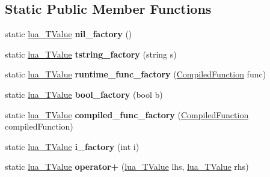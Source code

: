 \subsection*{Static Public Member Functions}
\begin{DoxyCompactItemize}
\item 
\mbox{\label{classzlua_1_1lua___t_value_a9b0783880dcd50991ac1f6abb71f5c25}} 
static \mbox{\hyperlink{classzlua_1_1lua___t_value}{lua\+\_\+\+T\+Value}} {\bfseries nil\+\_\+factory} ()
\item 
\mbox{\label{classzlua_1_1lua___t_value_a8bd4399873075abd5d6610da5966a171}} 
static \mbox{\hyperlink{classzlua_1_1lua___t_value}{lua\+\_\+\+T\+Value}} {\bfseries tstring\+\_\+factory} (string s)
\item 
\mbox{\label{classzlua_1_1lua___t_value_a8a92c76819e7f16495848cbc6daf6c25}} 
static \mbox{\hyperlink{classzlua_1_1lua___t_value}{lua\+\_\+\+T\+Value}} {\bfseries runtime\+\_\+func\+\_\+factory} (\mbox{\hyperlink{classzlua_1_1_compiled_function}{Compiled\+Function}} func)
\item 
\mbox{\label{classzlua_1_1lua___t_value_a21f1aa815c2d630491ea1972eb89b789}} 
static \mbox{\hyperlink{classzlua_1_1lua___t_value}{lua\+\_\+\+T\+Value}} {\bfseries bool\+\_\+factory} (bool b)
\item 
\mbox{\label{classzlua_1_1lua___t_value_a8027e82c713365a731fc06433a326b95}} 
static \mbox{\hyperlink{classzlua_1_1lua___t_value}{lua\+\_\+\+T\+Value}} {\bfseries compiled\+\_\+func\+\_\+factory} (\mbox{\hyperlink{classzlua_1_1_compiled_function}{Compiled\+Function}} compiled\+Function)
\item 
\mbox{\label{classzlua_1_1lua___t_value_afc07e7986c5c9b9b39994222f19e8be6}} 
static \mbox{\hyperlink{classzlua_1_1lua___t_value}{lua\+\_\+\+T\+Value}} {\bfseries i\+\_\+factory} (int i)
\item 
\mbox{\label{classzlua_1_1lua___t_value_ac953d7451177d288a1d82026049bc2ae}} 
static \mbox{\hyperlink{classzlua_1_1lua___t_value}{lua\+\_\+\+T\+Value}} {\bfseries operator+} (\mbox{\hyperlink{classzlua_1_1lua___t_value}{lua\+\_\+\+T\+Value}} lhs, \mbox{\hyperlink{classzlua_1_1lua___t_value}{lua\+\_\+\+T\+Value}} rhs)

\end{DoxyCompactItemize}
